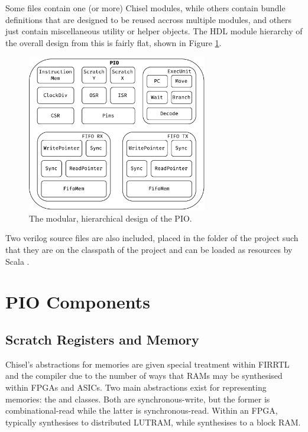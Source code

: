 Some files contain one (or more) Chisel modules, while others contain bundle definitions that are designed to be reused accross multiple modules, and others just contain miscellaneous utility or helper objects. The HDL module hierarchy of the overall design from this is fairly flat, shown in Figure \ref {fig:hdl_hierarchy}.

\begin{figure}[H]
    \centering
    \includegraphics[width=0.7\textwidth]{../img/pio-top.png}
    \caption{The modular, hierarchical design of the PIO.}
    \label{fig:hdl_hierarchy}
\end{figure}

Two verilog source files are also included, placed in the  folder of the project such that they are on the classpath of the project and can be loaded as resources by Scala \cite{sbt}.

\section{PIO Components}

\subsection{Scratch Registers and Memory}
\label{sec:readwrite}

Chisel's abstractions for memories are given special treatment within FIRRTL and the compiler due to the number of ways that RAMs may be synthesised within FPGAs and ASICs. Two main abstractions exist for representing memories: the  and  classes. Both are synchronous-write, but the former is combinational-read while the latter is synchronous-read. Within an FPGA,  typically synthesises to distributed LUTRAM, while  synthesises to a block RAM.

